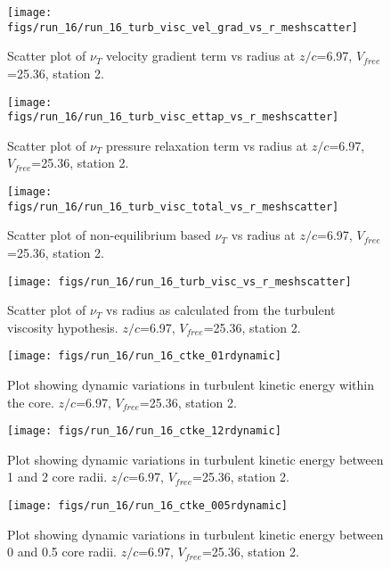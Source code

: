 \begin{figure}[H]
\centering
\texttt{[image: figs/run\_16/run\_16\_turb\_visc\_vel\_grad\_vs\_r\_meshscatter]}
\caption{Scatter plot of $\nu_T$ velocity gradient term vs radius at $z/c$=6.97, $V_{free}$=25.36, station 2.}
\end{figure}


\begin{figure}[H]
\centering
\texttt{[image: figs/run\_16/run\_16\_turb\_visc\_ettap\_vs\_r\_meshscatter]}
\caption{Scatter plot of $\nu_T$ pressure relaxation term vs radius at $z/c$=6.97, $V_{free}$=25.36, station 2.}
\end{figure}


\begin{figure}[H]
\centering
\texttt{[image: figs/run\_16/run\_16\_turb\_visc\_total\_vs\_r\_meshscatter]}
\caption{Scatter plot of non-equilibrium based $\nu_T$ vs radius at $z/c$=6.97, $V_{free}$=25.36, station 2.}
\end{figure}


\begin{figure}[H]
\centering
\texttt{[image: figs/run\_16/run\_16\_turb\_visc\_vs\_r\_meshscatter]}
\caption{Scatter plot of $\nu_T$ vs radius as calculated from the turbulent viscosity hypothesis. $z/c$=6.97, $V_{free}$=25.36, station 2.}
\end{figure}


\begin{figure}[H]
\centering
\texttt{[image: figs/run\_16/run\_16\_ctke\_01rdynamic]}
\caption{Plot showing dynamic variations in turbulent kinetic energy within the core. $z/c$=6.97, $V_{free}$=25.36, station 2.}
\end{figure}


\begin{figure}[H]
\centering
\texttt{[image: figs/run\_16/run\_16\_ctke\_12rdynamic]}
\caption{Plot showing dynamic variations in turbulent kinetic energy between 1 and 2 core radii. $z/c$=6.97, $V_{free}$=25.36, station 2.}
\end{figure}


\begin{figure}[H]
\centering
\texttt{[image: figs/run\_16/run\_16\_ctke\_005rdynamic]}
\caption{Plot showing dynamic variations in turbulent kinetic energy between 0 and 0.5 core radii. $z/c$=6.97, $V_{free}$=25.36, station 2.}
\end{figure}


